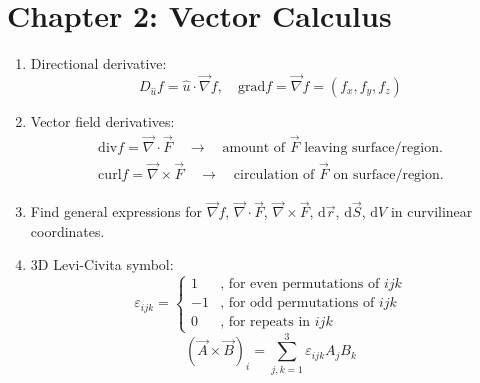 \documentclass{article}
\begin{document}
\section{Chapter 2: Vector Calculus}
\begin{enumerate}
\item Directional derivative:
\begin{equation}
D_{\hat{u}}f=\hat{u}\cdot \vec{\nabla}f, \quad \mathrm{grad} f = \vec{\nabla}f = (f_x, f_y, f_z)
\end{equation}
\item Vector field derivatives:
\begin{align}
\mathrm{div}f = \vec{\nabla}\cdot\vec{F}\quad \rightarrow\quad \text{amount of }\vec{F}\text{ leaving surface/region.}\\
\mathrm{curl}f = \vec{\nabla}\times\vec{F}\quad\rightarrow\quad \text{circulation of }\vec{F}\text{ on surface/region.}
\end{align}
\item Find general expressions for $\vec{\nabla}f$, $\vec{\nabla}\cdot\vec{F}$, $\vec{\nabla}\times\vec{F}$, $\mathrm{d}\vec{r}$, $\mathrm{d}\vec{S}$, $\mathrm{d}V$ in curvilinear coordinates.
\item 3D Levi-Civita symbol:
\begin{equation}
\varepsilon_{ijk} =
		\begin{cases}
			1 & \text{, for even permutations of } ijk \\
			-1 & \text{, for odd permutations of } ijk \\
			0 & \text{, for repeats in } ijk
		\end{cases}
\end{equation}
\begin{equation}
(\vec{A}\times\vec{B})_i = \sum_{j,k=1}^3\varepsilon_{ijk}A_jB_k
\end{equation}
\end{enumerate}
\vfill
\end{document}
